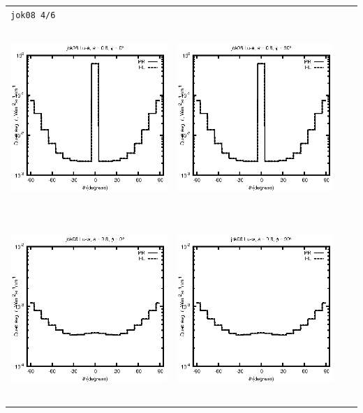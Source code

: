 \documentclass[10pt,a4paper]{article}
\begin{document}
\begin{adjustwidth}{-1.2in}{-1.2in}
\begin{tabular}{c c c c}
\multicolumn{4}{l}{\texttt{jok08 4/6}} \\
\includegraphics[height=7cm]{../eps/jok08_Lu_a_fwd.eps} &
\includegraphics[height=7cm]{../eps/jok08_Lu_a_cross.eps}\\
\includegraphics[height=7cm]{../eps/jok08_Lu_w_fwd.eps} &
\includegraphics[height=7cm]{../eps/jok08_Lu_w_cross.eps} \\

\end{tabular}
\end{adjustwidth}
\end{document}
